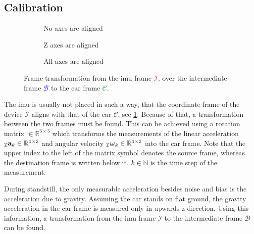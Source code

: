 \subsection{Calibration}
\label{ssec:calibration_imu}
\begin{figure}[htb]
	\centering
	\begin{subfigure}[b]{0.3\textwidth}
		\centering
		
		\caption{No axes are aligned}
		\label{fig:tikz_frame_transformation_init}
	\end{subfigure}
	\hfill
	\begin{subfigure}[b]{0.3\textwidth}
		\centering
		
		\caption{Z axes are aligned}
		\label{fig:tikz_frame_transformation_intermediate}
	\end{subfigure}
	\hfill
	\begin{subfigure}[b]{0.3\textwidth}
		\centering
		
		\caption{All axes are aligned}
		\label{fig:tikz_frame_transformation_final}
	\end{subfigure}
	\caption[Frame transformation]{Frame transformation from the \gls{imu} frame \textcolor{red}{$\mathcal{I}$}, over the intermediate frame \textcolor{blue}{$\mathcal{B}$} to the car frame \textcolor{green}{$\mathcal{C}$}.}
	\label{fig:tikz_frame_transformation}
\end{figure}
The \gls{imu} is usually not placed in such a way, that the coordinate frame of the device $\mathcal{I}$ aligns with that of the car $\mathcal{C}$, see \cref{fig:tikz_frame_transformation_init}.
Because of that, a transformation between the two frames must be found.
This can be achieved using a rotation matrix  $\in \mathbb{R}^{3\times3}$ which transforms the measurements of the linear acceleration $\vincs{a}{I}_k \in \mathbb{R}^{1\times3}$ and angular velocity ${\vincs{\boldsymbol{\omega}}{I}_k \in \mathbb{R}^{1\times3}}$ into the car frame.
Note that the upper index to the left of the matrix symbol denotes the source frame, whereas the destination frame is written below it.
$k \in \mathbb{N}$ is the time step of the measurement.\par
During standstill, the only measurable acceleration besides noise and bias is the acceleration due to gravity.
Assuming the car stands on flat ground, the gravity acceleration in the car frame is measured only in upwards z-direction.
Using this information, a transformation from the \gls{imu} frame $\mathcal{I}$ to the intermediate frame $\mathcal{B}$ can be found.
